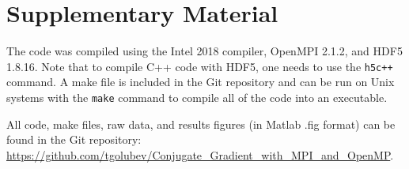\documentclass{article}
\begin{document}
\section*{Supplementary Material}   %
The code was compiled using the Intel 2018 compiler, OpenMPI 2.1.2, and HDF5 1.8.16. Note that to compile C++ code with HDF5, one needs to use the \texttt{h5c++} command. A make file is included in the Git repository and can be run on Unix systems with the \texttt{make} command to compile all of the code into an executable.

All code, make files, raw data, and results figures (in Matlab .fig format) can be found in the Git repository: 
\url{https://github.com/tgolubev/Conjugate_Gradient_with_MPI_and_OpenMP}.
\end{document}
